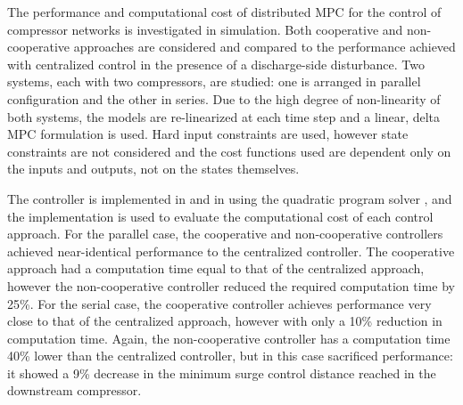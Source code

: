 The performance and computational cost of distributed MPC for the control of compressor networks is investigated in simulation.
Both cooperative and non-cooperative approaches are considered and compared to the performance achieved with centralized control in the presence of a discharge-side disturbance.
Two systems, each with two compressors, are studied: one is arranged in parallel configuration and the other in series.
Due to the high degree of non-linearity of both systems, the models are re-linearized at each time step and a linear, delta MPC formulation is used.
Hard input constraints are used, however state constraints are not considered and the cost functions used are dependent only on the inputs and outputs, not on the states themselves.

The controller is implemented in \slink{} and in \cpp{} using the quadratic program solver \qpoases{}, and the \cpp{} implementation is used to evaluate the computational cost of each control approach.
For the parallel case, the cooperative and non-cooperative controllers achieved near-identical performance to the centralized controller.
The cooperative approach had a computation time equal to that of the centralized approach, however the non-cooperative controller reduced the required computation time by 25\%.
For the serial case, the cooperative controller achieves performance very close to that of the centralized approach, however with only a 10\% reduction in computation time.
Again, the non-cooperative controller has a computation time 40\% lower than the centralized controller, but in this case sacrificed performance: it showed a 9\% decrease in the minimum surge control distance reached in the downstream compressor.

